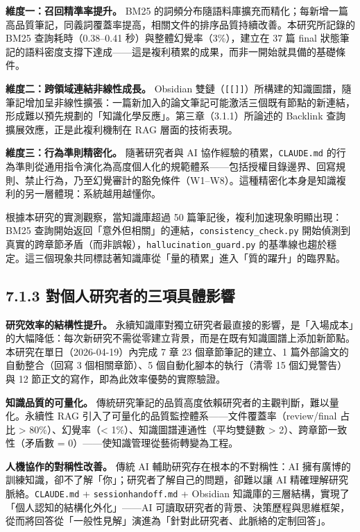 \textbf{維度一：召回精準率提升。} BM25
的詞頻分布隨語料庫擴充而精化；每新增一篇高品質筆記，同義詞覆蓋率提高，相關文件的排序品質持續改善。本研究所記錄的
BM25 查詢耗時（0.38--0.41 秒）與整體幻覺率（3\%），建立在 37 篇 final
狀態筆記的語料密度支撐下達成------這是複利積累的成果，而非一開始就具備的基礎條件。

\textbf{維度二：跨領域連結非線性成長。} Obsidian
雙鏈（\texttt{{[}{[}{]}{]}}）所構建的知識圖譜，隨筆記增加呈非線性擴張：一篇新加入的論文筆記可能激活三個既有節點的新連結，形成難以預先規劃的「知識化學反應」。第三章（3.1.1）所論述的
Backlink 查詢擴展效應，正是此複利機制在 RAG 層面的技術表現。

\textbf{維度三：行為準則精密化。} 隨著研究者與 AI
協作經驗的積累，\texttt{CLAUDE.md}
的行為準則從通用指令演化為高度個人化的規範體系------包括授權目錄邊界、回寫規則、禁止行為，乃至幻覺審計的豁免條件（W1--W8）。這種精密化本身是知識複利的另一層體現：系統越用越懂你。

根據本研究的實測觀察，當知識庫超過 50
篇筆記後，複利加速現象明顯出現：BM25
查詢開始返回「意外但相關」的連結，\texttt{consistency\_check.py}
開始偵測到真實的跨章節矛盾（而非誤報），\texttt{hallucination\_guard.py}
的基準線也趨於穩定。這三個現象共同標誌著知識庫從「量的積累」進入「質的躍升」的臨界點。

\subsection{7.1.3
對個人研究者的三項具體影響}\label{ux5c0dux500bux4ebaux7814ux7a76ux8005ux7684ux4e09ux9805ux5177ux9ad4ux5f71ux97ff}

\textbf{研究效率的結構性提升。}
永續知識庫對獨立研究者最直接的影響，是「入場成本」的大幅降低：每次新研究不需從零建立背景，而是在既有知識圖譜上添加新節點。本研究在單日（2026-04-19）內完成
7 章 23 個章節筆記的建立、1 篇外部論文的自動整合（回寫 3 個相關章節）、5
個自動化腳本的執行（清零 15 個幻覺警告）與 12
節正文的寫作，即為此效率優勢的實際驗證。

\textbf{知識品質的可量化。}
傳統研究筆記的品質高度依賴研究者的主觀判斷，難以量化。永續性 RAG
引入了可量化的品質監控體系------文件覆蓋率（review/final 占比
\textgreater{} 80\%）、幻覺率（\textless{}
1\%）、知識圖譜連通性（平均雙鏈數 \textgreater{}
2）、跨章節一致性（矛盾數 = 0）------使知識管理從藝術轉變為工程。

\textbf{人機協作的對稱性改善。} 傳統 AI 輔助研究存在根本的不對稱性：AI
擁有廣博的訓練知識，卻不了解「你」；研究者了解自己的問題，卻難以讓 AI
精確理解研究脈絡。\texttt{CLAUDE.md} + \texttt{sessionhandoff.md} +
Obsidian 知識庫的三層結構，實現了「個人認知的結構化外化」------AI
可讀取研究者的背景、決策歷程與思維框架，從而將回答從「一般性見解」演進為「針對此研究者、此脈絡的定制回答」。

